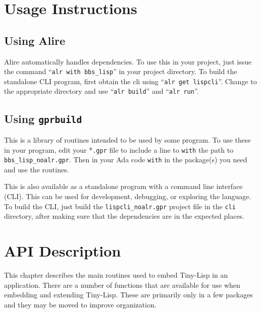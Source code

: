 \documentclass[10pt, openany]{book}
\newcommand{\keyword}[1]{\texttt{#1}}
\newcommand{\tl}{Tiny-Lisp}
\begin{document}
\chapter{Usage Instructions}

\section{Using Alire}
Alire automatically handles dependencies.  To use this in your project, just issue the command ``\keyword{alr with bbs\_lisp}'' in your project directory.  To build the standalone CLI program, first obtain the cli using ``\keyword{alr get lispcli}''.  Change to the appropriate directory and use ``\keyword{alr build}'' and ``\keyword{alr run}''.

\section{Using \keyword{gprbuild}}
This is a library of routines intended to be used by some program.  To use these in your program, edit your *\keyword{.gpr} file to include a line to \keyword{with} the path to \keyword{bbs\_lisp\_noalr.gpr}.  Then in your Ada code \keyword{with} in the package(s) you need and use the routines.

This is also available as a standalone program with a command line interface (CLI).  This can be used for development, debugging, or exploring the language.  To build the CLI, just build the \keyword{lispcli\_noalr.gpr} project file in the \keyword{cli} directory, after making sure that the dependencies are in the expected places.

\chapter{API Description}
This chapter describes the main routines used to embed \tl{} in an application.  There are a number of functions that are available for use when embedding and extending \tl{}.  These are primarily only in a few packages and they may be moved to improve organization.


\end{document}
